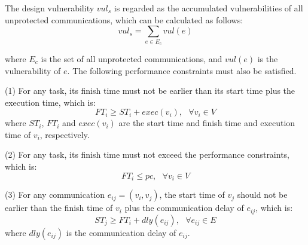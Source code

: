 \documentclass[10pt,journal, compsoc]{IEEEtran}
\begin{document}
The design vulnerability $vul_s$ is regarded as the accumulated vulnerabilities of all unprotected communications, which can be calculated as follows:
\begin{equation}
vul_s=\sum \limits_{e\in E_c}vul(e)
\end{equation}

\noindent where $E_c$ is the set of all unprotected communications, and $vul(e)$ is the vulnerability of $e$. The following performance constraints must also be satisfied.

(1) For any task, its finish time must not be earlier than its start time plus the execution time, which is:
\begin{equation}
	FT_i \geq ST_i + exec(v_i), ~~~\forall v_i \in V
\end{equation}
where $ST_i$, $FT_i$ and $exec(v_i)$ are the start time and finish time and execution time of $v_i$, respectively.

(2) For any task, its finish time must not exceed the performance constraints, which is:
\begin{equation}
FT_i \leq pc,~~~ \forall v_i \in V
\end{equation}

(3) For any communication $e_{ij}=(v_i, v_j)$, the start time of $v_j$ should not be earlier than the finish time of $v_i$ plus the communication delay of $e_{ij}$, which is:
\begin{equation}
	ST_j \geq FT_i + dly(e_{ij}), ~~~\forall e_{ij} \in E
\end{equation}
where $dly(e_{ij})$ is the communication delay of $e_{ij}$.






\end{document}

